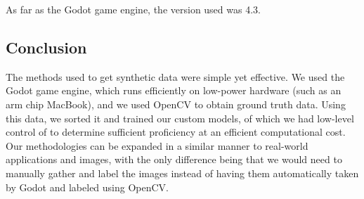 As far as the Godot game engine, the version used was 4.3.

\subsection{Conclusion}
The methods used to get synthetic data were simple yet effective. We used the Godot game engine, which runs efficiently on low-power hardware (such as an arm chip MacBook), and we used OpenCV to obtain ground truth data. Using this data, we sorted it and trained our custom models, of which we had low-level control of to determine sufficient proficiency at an efficient computational cost. Our methodologies can be expanded in a similar manner to real-world applications and images, with the only difference being that we would need to manually gather and label the images instead of having them automatically taken by Godot and labeled using OpenCV.
